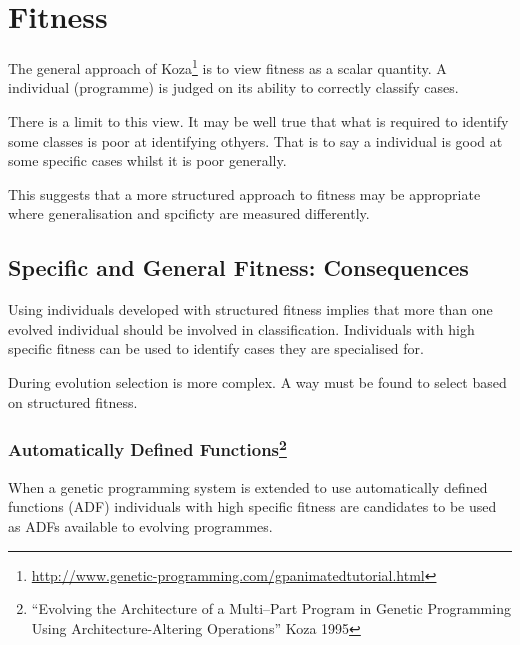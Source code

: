 \documentclass[a4paper,twoside]{article}
\begin{document}
\section{Fitness}

The general approach of
Koza\footnote{\url{http://www.genetic-programming.com/gpanimatedtutorial.html}}
is to view fitness as a scalar quantity.  A individual (programme) is
judged on its ability to correctly classify cases.

There is a limit to this view.  It may be well true that what is
required to identify some classes is poor at identifying othyers.
That is to say a individual is good at some specific cases whilst it
is poor generally.

This suggests that a more structured approach to fitness may be
appropriate where generalisation and spcificty are measured
differently.

\subsection{Specific and General Fitness: Consequences}

Using individuals developed with structured fitness implies that more
than one evolved individual should be involved in classification.
Individuals with high specific fitness can be used to identify cases
they are specialised for.

During evolution selection is more complex.  A way must be found to
select based on structured fitness.

\subsubsection{Automatically Defined Functions\footnote{``Evolving the Architecture of a Multi--Part Program in Genetic Programming Using Architecture-Altering Operations'' Koza 1995}}

When a genetic programming system is extended to use automatically
defined functions (ADF) individuals with high specific fitness are
candidates to be used as ADFs available to evolving programmes.


  
\end{document}
